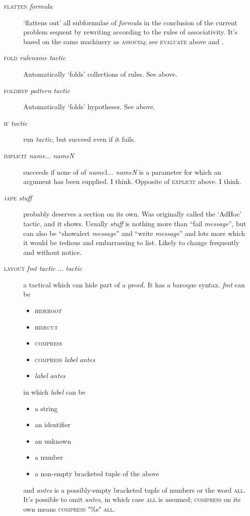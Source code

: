 \begin{description}
\item [\textsc{flatten} \textit{formula}] `flattens out' all subformulae of \textit{formula} in the conclusion of the current problem sequent by rewriting according to the rules of associativity. It's based on the same machinery as \textsc{assoceq}; see \textsc{evaluate} above and .


\item [\textsc{fold} \textit{rulename} \textit{tactic}] Automatically `folds' collections of rules. See  above.\\
\item [\textsc{foldhyp} \textit{pattern tactic}] Automatically `folds' hypotheses. See  above.\\
\item [\textsc{if} \textit{tactic}] run \textit{tactic}, but succeed even if it fails.


\item [\textsc{implicit} \textit{name}... \textit{nameN}] succeeds if none of of \textit{name}1... \textit{nameN} is a parameter for which an argument has been supplied. I think. Opposite of \textsc{explicit} above. I think.


\item [\textsc{jape} \textit{stuff} ] probably deserves a section on its own. Was originally called the `AdHoc' tactic, and it shows. Usually \textit{stuff} is nothing more than ``fail \textit{message}'', but can also be ``showalert \textit{message}'' and ``write \textit{message}'' and lots more which it would be tedious and embarrassing to list. Likely to change frequently and without notice.


\item [\textsc{layout} \textit{fmt} \textit{tactic} ... \textit{tactic}] a tactical which can hide part of a proof. It has a baroque syntax. \textit{fmt} can be 
\begin{itemize}
\item \textsc{hideroot}
\item \textsc{hidecut} 
\item \textsc{compress}
\item \textsc{compress} \textit{label} \textit{antes}
\item \textit{label} \textit{antes}
\end{itemize}
in which \textit{label} can be \begin{itemize}
\item a string
\item an identifier
\item an unknown
\item a number 
\item a non-empty bracketed tuple of the above
\end{itemize}
and \textit{antes} is a possibly-empty bracketed tuple of numbers or the word \textsc{all}. It's possible to omit \textit{antes}, in which case \textsc{all} is assumed; \textsc{compress} on its own means \textsc{compress} "\%s" \textsc{all}.


\end{description}
